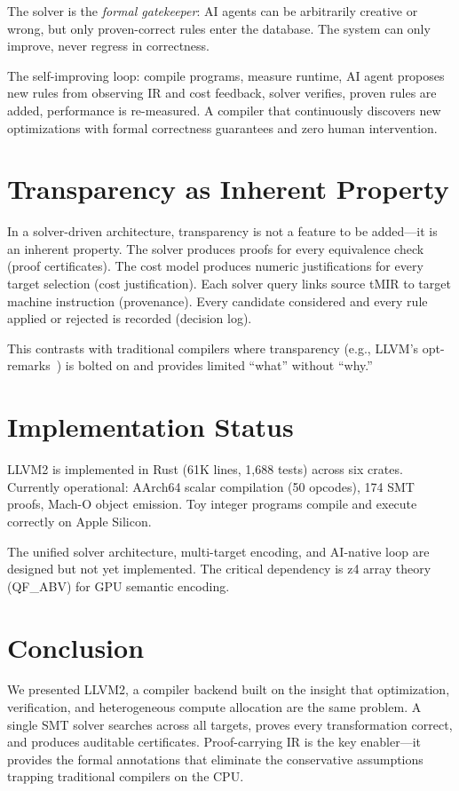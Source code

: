 \documentclass[11pt,twocolumn]{article}
\begin{document}
The solver is the \emph{formal gatekeeper}: AI agents can be arbitrarily creative or wrong, but only proven-correct rules enter the database. The system can only improve, never regress in correctness.

The self-improving loop: compile programs, measure runtime, AI agent proposes new rules from observing IR and cost feedback, solver verifies, proven rules are added, performance is re-measured. A compiler that continuously discovers new optimizations with formal correctness guarantees and zero human intervention.

\section{Transparency as Inherent Property}

In a solver-driven architecture, transparency is not a feature to be added---it is an inherent property. The solver produces proofs for every equivalence check (proof certificates). The cost model produces numeric justifications for every target selection (cost justification). Each solver query links source tMIR to target machine instruction (provenance). Every candidate considered and every rule applied or rejected is recorded (decision log).

This contrasts with traditional compilers where transparency (e.g., LLVM's opt-remarks~\cite{llvm-remarks}) is bolted on and provides limited ``what'' without ``why.''

\section{Implementation Status}

LLVM2 is implemented in Rust (61K lines, 1,688 tests) across six crates. Currently operational: AArch64 scalar compilation (50 opcodes), 174 SMT proofs, Mach-O object emission. Toy integer programs compile and execute correctly on Apple Silicon.

The unified solver architecture, multi-target encoding, and AI-native loop are designed but not yet implemented. The critical dependency is z4 array theory (QF\_ABV) for GPU semantic encoding.

\section{Conclusion}

We presented LLVM2, a compiler backend built on the insight that optimization, verification, and heterogeneous compute allocation are the same problem. A single SMT solver searches across all targets, proves every transformation correct, and produces auditable certificates. Proof-carrying IR is the key enabler---it provides the formal annotations that eliminate the conservative assumptions trapping traditional compilers on the CPU.
\end{document}
